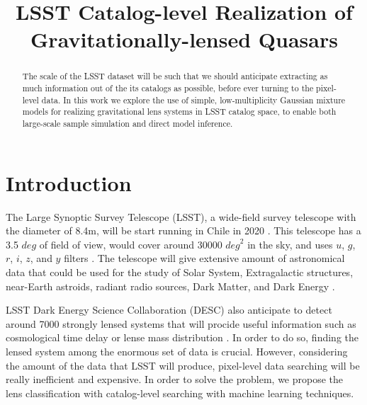 \documentclass[\docopts]{\docclass}
\begin{document}
\title{ LSST Catalog-level Realization of Gravitationally-lensed Quasars }

\maketitlepre

\begin{abstract}

The scale of the LSST dataset will be such that we should anticipate
extracting as much information out of the its catalogs as possible,
before ever turning to the pixel-level data. In this work we explore the
use of simple, low-multiplicity Gaussian mixture models for realizing
gravitational lens systems in LSST catalog space, to enable both
large-scale sample simulation and direct model inference.

\end{abstract}

\maketitlepost


\section{Introduction}
\label{sec:intro}

The Large Synoptic Survey Telescope (LSST), a wide-field survey telescope with the diameter of 8.4m, will be start running in Chile in 2020 \cite{LSST_overall}. This telescope has a 3.5 $deg$ of field of view, would cover around 30000 $\textit{deg}^2$ in the sky, and uses $u$, $g$, $r$, $i$, $z$, and $y$ filters \cite{LSSTScienceBookv2}. The telescope will give extensive amount of astronomical data that could be used for the study of Solar System, Extragalactic structures, near-Earth astroids, radiant radio sources, Dark Matter, and Dark Energy \cite{LSSTScienceBookv2}. 

LSST Dark Energy Science Collaboration (DESC) also anticipate to detect around 7000 strongly lensed systems that will procide useful information such as cosmological time delay or lense mass distribution \cite{DESC_overall} \cite{TimeDelayOverall} \cite{Twinkles}. In order to do so, finding the lensed system among the enormous set of data is crucial. However, considering the amount of the data that LSST will produce, pixel-level data searching will be really inefficient and expensive. In order to solve the problem, we propose the lens classification with catalog-level searching with machine learning techniques.
\end{document}
